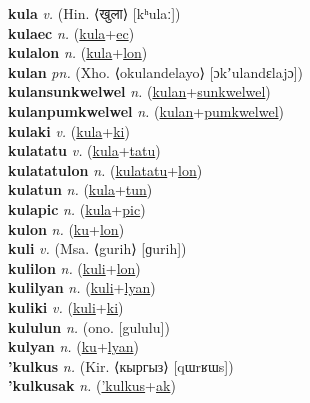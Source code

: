 \textbf{kula} \textit{v.} (Hin. ⟨खुला⟩ [kʰulaː])
 \label{kula} \\
\textbf{kulaec} \textit{n.} (\hyperref[kula]{kula}+\hyperref[ec]{ec})
 \label{kulaec} \\
\textbf{kulalon} \textit{n.} (\hyperref[kula]{kula}+\hyperref[lon]{lon})
 \label{kulalon} \\
\textbf{kulan} \textit{pn.} (Xho. ⟨okulandelayo⟩ [ɔkʼulandɛlajɔ])
 \label{kulan} \\
\textbf{kulansunkwelwel} \textit{n.} (\hyperref[kulan]{kulan}+\hyperref[sunkwelwel]{sunkwelwel})
 \label{kulansunkwelwel} \\
\textbf{kulanpumkwelwel} \textit{n.} (\hyperref[kulan]{kulan}+\hyperref[pumkwelwel]{pumkwelwel})
 \label{kulanpumkwelwel} \\
\textbf{kulaki} \textit{v.} (\hyperref[kula]{kula}+\hyperref[ki]{ki})
 \label{kulaki} \\
\textbf{kulatatu} \textit{v.} (\hyperref[kula]{kula}+\hyperref[tatu]{tatu})
 \label{kulatatu} \\
\textbf{kulatatulon} \textit{n.} (\hyperref[kulatatu]{kulatatu}+\hyperref[lon]{lon})
 \label{kulatatulon} \\
\textbf{kulatun} \textit{n.} (\hyperref[kula]{kula}+\hyperref[tun]{tun})
 \label{kulatun} \\
\textbf{kulapic} \textit{n.} (\hyperref[kula]{kula}+\hyperref[pic]{pic})
 \label{kulapic} \\
\textbf{kulon} \textit{n.} (\hyperref[ku]{ku}+\hyperref[lon]{lon})
 \label{kulon} \\
\textbf{kuli} \textit{v.} (Msa. ⟨gurih⟩ [ɡurih])
 \label{kuli} \\
\textbf{kulilon} \textit{n.} (\hyperref[kuli]{kuli}+\hyperref[lon]{lon})
 \label{kulilon} \\
\textbf{kulilyan} \textit{n.} (\hyperref[kuli]{kuli}+\hyperref[lyan]{lyan})
 \label{kulilyan} \\
\textbf{kuliki} \textit{v.} (\hyperref[kuli]{kuli}+\hyperref[ki]{ki})
 \label{kuliki} \\
\textbf{kululun} \textit{n.} (ono. [gululu])
 \label{kululun} \\
\textbf{kulyan} \textit{n.} (\hyperref[ku]{ku}+\hyperref[lyan]{lyan})
 \label{kulyan} \\
\textbf{'kulkus} \textit{n.} (Kir. ⟨кыргыз⟩ [qɯrʁɯs])
 \label{'kulkus} \\
\textbf{'kulkusak} \textit{n.} (\hyperref['kulkus]{'kulkus}+\hyperref[ak]{ak})
 \label{'kulkusak} \\
